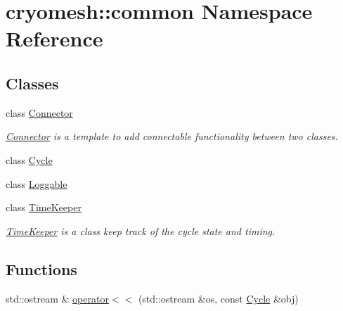 \hypertarget{namespacecryomesh_1_1common}{\section{cryomesh\-:\-:common \-Namespace \-Reference}
\label{namespacecryomesh_1_1common}
}
\subsection*{\-Classes}
\begin{DoxyCompactItemize}
\item 
class \hyperlink{classcryomesh_1_1common_1_1Connector}{\-Connector}
\begin{DoxyCompactList}\small\item\em \hyperlink{classcryomesh_1_1common_1_1Connector}{\-Connector} is a template to add connectable functionality between two classes. \end{DoxyCompactList}\item 
class \hyperlink{classcryomesh_1_1common_1_1Cycle}{\-Cycle}
\item 
class \hyperlink{classcryomesh_1_1common_1_1Loggable}{\-Loggable}
\item 
class \hyperlink{classcryomesh_1_1common_1_1TimeKeeper}{\-Time\-Keeper}
\begin{DoxyCompactList}\small\item\em \hyperlink{classcryomesh_1_1common_1_1TimeKeeper}{\-Time\-Keeper} is a class keep track of the cycle state and timing. \end{DoxyCompactList}\end{DoxyCompactItemize}
\subsection*{\-Functions}
\begin{DoxyCompactItemize}
\item 
std\-::ostream \& \hyperlink{namespacecryomesh_1_1common_a09ffb633342203192e93c454f4dbd6f9}{operator$<$$<$} (std\-::ostream \&os, const \hyperlink{classcryomesh_1_1common_1_1Cycle}{\-Cycle} \&obj)
\end{DoxyCompactItemize}


